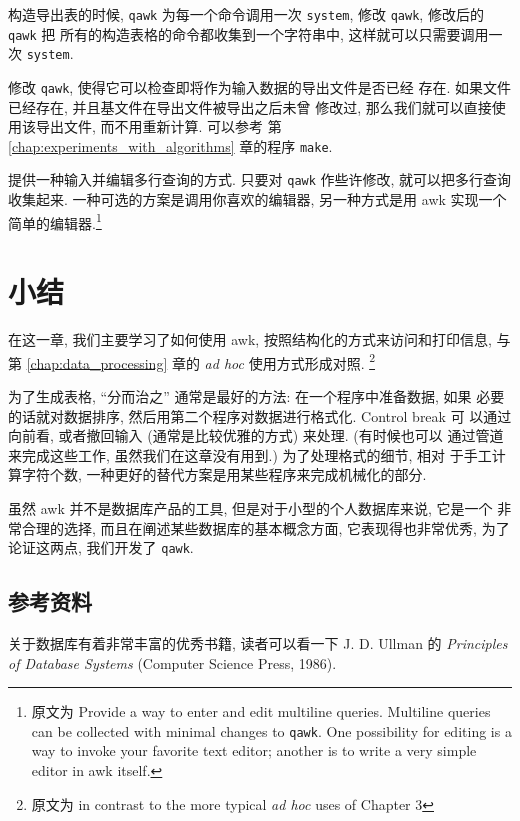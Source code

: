 \begin{exercise}
    \label{exer:system}
	构造导出表的时候, \texttt{qawk} 为每一个命令调用一次
	\texttt{system}, 修改 \texttt{qawk}, 修改后的 \texttt{qawk} 把
	所有的构造表格的命令都收集到一个字符串中, 这样就可以只需要调用一次
	\texttt{system}. 
\end{exercise}

\begin{exercise}
    \label{exer:qawk}
	修改 \texttt{qawk}, 使得它可以检查即将作为输入数据的导出文件是否已经
	存在. 如果文件已经存在, 并且基文件在导出文件被导出之后未曾
	修改过, 那么我们就可以直接使用该导出文件, 而不用重新计算. 可以参考
	第 \ref{chap:experiments_with_algorithms} 章的程序 \texttt{make}.
\end{exercise}

\begin{exercise}
    \label{exer:multiline_query}
	提供一种输入并编辑多行查询的方式. 只要对 \texttt{qawk} 作些许修改,
	就可以把多行查询收集起来. 一种可选的方案是调用你喜欢的编辑器,
	另一种方式是用 awk 实现一个简单的编辑器.\footnote{原文为 Provide a
		way to enter and edit multiline queries. Multiline queries
		can be collected with minimal changes to \texttt{qawk}. One
		possibility for editing is a way to invoke your favorite
		text editor; another is to write a very simple editor in
	awk itself.}
\end{exercise}

\section{小结}
\label{sec:reports_and_databases_summary}
在这一章, 我们主要学习了如何使用 awk, 按照结构化的方式来访问和打印信息,
与第 \ref{chap:data_processing} 章的 \textit{ad hoc} 使用方式形成对照.
\footnote{原文为 in contrast to the more typical \textit{ad hoc} uses of
Chapter 3}

为了生成表格, ``分而治之'' 通常是最好的方法: 在一个程序中准备数据, 如果 
必要的话就对数据排序, 然后用第二个程序对数据进行格式化. Control break 可
以通过向前看, 或者撤回输入 (通常是比较优雅的方式) 来处理. (有时候也可以
通过管道来完成这些工作, 虽然我们在这章没有用到.) 为了处理格式的细节, 相对
于手工计算字符个数, 一种更好的替代方案是用某些程序来完成机械化的部分.

虽然 awk 并不是数据库产品的工具, 但是对于小型的个人数据库来说, 它是一个
非常合理的选择, 而且在阐述某些数据库的基本概念方面, 它表现得也非常优秀,
为了论证这两点, 我们开发了 \texttt{qawk}.

\subsection*{参考资料}
关于数据库有着非常丰富的优秀书籍, 读者可以看一下 J. D. Ullman 的
\textit{Principles of Database Systems} (Computer Science Press, 1986).

